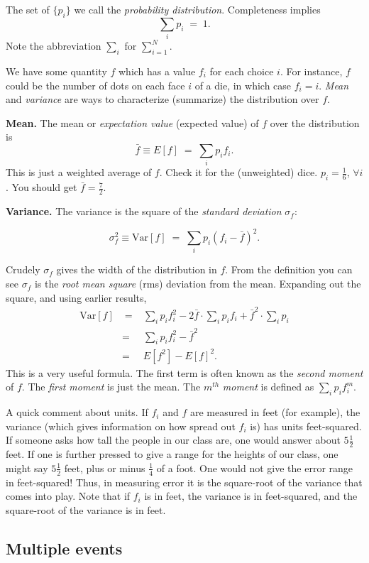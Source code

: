 \documentclass[12pt,letterpaper]{report}
\newcommand\be{\begin{equation}}
\newcommand\ee{\end{equation}}
\newcommand\bea{\begin{eqnarray}}
\newcommand\eea{\end{eqnarray}}
\newcommand{\var}{\text{Var}}
\begin{document}
The set of $\{p_i\}$ we call the {\em probability distribution}.
Completeness implies \be
    \sum_i p_i  \; = \; 1.
\ee Note the abbreviation $\sum_i$ for $\sum_{i=1}^N$.

We have some quantity $f$ which has a value $f_i$ for each choice
$i$. For instance, $f$ could be the number of dots on each face
$i$ of a die, in which case $f_i = i$. {\em Mean} and {\em
variance} are ways to characterize (summarize) the distribution
over $f$.

{\bf Mean.} The mean or {\em expectation value} (expected value)
of $f$ over the distribution is \be \label{eq:m}
    \bar{f} \equiv E[f]  \; = \; \sum_i p_i f_i .
\ee This is just a weighted average of $f$. Check it for the
(unweighted) dice. $p_i=\frac{1}{6}$, $\forall i$. You should get
$\bar{f} = \frac{7}{2}$.

{\bf Variance.} The variance is the square of the {\em standard
deviation} $\sigma_f$:

\be \label{eq:v}
    \sigma_f^2 \equiv \var[f] \; = \;
\sum_i p_i (f_i - \bar{f})^2. \ee

Crudely $\sigma_f$ gives the width of the distribution in $f$.
From the definition you can see $\sigma_f$ is the {\em root mean
square} (rms) deviation from the mean. Expanding out the square,
and using earlier results, \bea \label{eq:var}
    \var[f] & \; = \; & \sum_i p_i f_i^2 - 2\bar{f} \cdot \sum_i p_i f_i +
\bar{f}^2 \cdot \sum_i p_i \nonumber \\
& = & \sum_i p_i f_i^2 - \bar{f}^2 \nonumber \\
& = & E[f^2] - E[f]^2. \eea This is a very useful formula. The
first term is often known as the {\em second moment} of $f$. The
{\em first moment} is just the mean. The $m^{th}$ {\em moment} is
defined as $\sum_i p_i f^m_i$.

A quick comment about units. If $f_i$ and $f$ are measured in feet
(for example), the variance (which gives information on how spread
out $f_i$ is) has units feet-squared. If someone asks how tall the
people in our class are, one would answer about $5 \frac{1}{2}$
feet. If one is further pressed to give a range for the heights of
our class, one might say $5 \frac{1}{2}$ feet, plus or minus
$\frac{1}{4}$ of a foot. One would not give the error range in
feet-squared! Thus, in measuring error it is the square-root of
the variance that comes into play. Note that if $f_i$ is in feet,
the variance is in feet-squared, and the square-root of the
variance is in feet.

\subsection{Multiple events}
\end{document}

